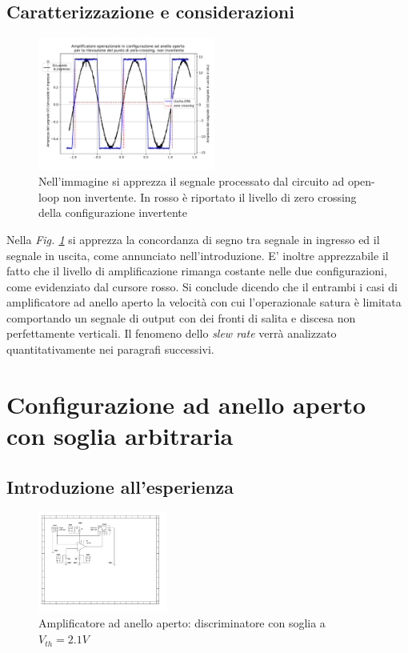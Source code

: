 \documentclass[journal]{IEEEtran}
\begin{document}
\subsection{\textbf{Caratterizzazione e considerazioni}}
\begin{figure}[H]%
\begin {center}
\includegraphics[width=0.52\textwidth]{analysis/output/OPA-open-loop-non-inv-zero-crossing-z2.pdf}
\caption{Nell'immagine si apprezza il segnale processato dal circuito ad open-loop non invertente. In rosso è riportato il livello di zero crossing della configurazione invertente }
\label{fig:open_loop_non_inv_zc}
\end {center}
\end{figure}
Nella \textit{Fig. \ref{fig:open_loop_non_inv_zc}} si apprezza la concordanza di segno tra segnale in ingresso ed il segnale in uscita, come annunciato nell'introduzione. E' inoltre apprezzabile il fatto che il livello di amplificazione rimanga costante nelle due configurazioni, come evidenziato dal cursore rosso.
Si conclude dicendo che il entrambi i casi di amplificatore ad anello aperto la velocità con cui l'operazionale satura è limitata comportando un segnale di output con dei fronti di salita e discesa non perfettamente verticali. Il fenomeno dello  \textit{slew rate} verrà analizzato quantitativamente nei paragrafi successivi.  
\section{\textbf{Configurazione ad anello aperto con soglia arbitraria}} %
\subsection{\textbf{Introduzione all'esperienza}}
\begin{figure}[H]%
\begin {center}
\includegraphics[width=0.38\textwidth]{sch-simulations/output/OPA-biased.pdf}
\caption{Amplificatore ad anello aperto: discriminatore con soglia a $V_{th} = 2.1 V$}
\label{fig:circ_open_loop_biased}
\end {center}
\end{figure}
\end{document}

